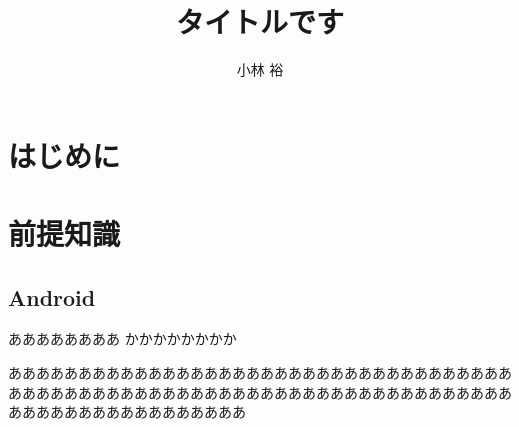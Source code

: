 \documentclass[a4j]{jarticle}
\date{}
\begin{document}
\makeatletter %
	\def\@thesis{平成28年度 東邦大学理学部情報科学科 卒業研究}
	\def\id#1{\def\@id{#1}}
	\def\department#1{\def\@department{#1}}
	
	\def\@maketitle{
		\begin{center}
			\vspace{10mm}
			{\large \@thesis \par}	%
			\vspace{50mm}
			{\huge\bf \@title \par}	%
			\vspace{15mm}
			{\Large 学籍番号　\@id \par}	%
			\vspace{5mm}
			{\Large \@author \par}	%
			\vspace{50mm}
		\end{center}
		\begin{flushright}
			{\large 金岡研究室}
		\end{flushright}
	}
\makeatother

\title{タイトルです} %
\id{5517044} %
\author{小林 裕} %
\maketitle{\title} %
\thispagestyle{empty} %
\newpage %

\tableofcontents %





\newpage
\section{はじめに} 




\newpage
\section{前提知識}
\subsection{Android}

ああああああああ
かかかかかかかか

あああああああああああああああああああああああああああああああああああああああああああああああああああああああああああああああああああああああああああああああああああああああああ
\end{document}
